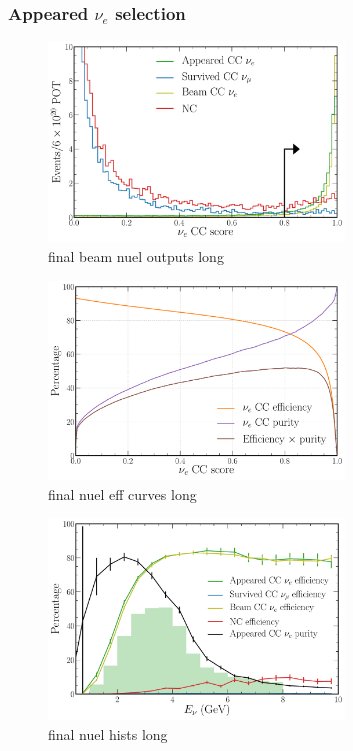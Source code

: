 \subsubsection*{Appeared $\nu_{e}$ selection} %

\begin{figure} %
    \includegraphics[width=0.7\textwidth]{diagrams/6-cvn/chipsnet/final_beam_nuel_outputs.pdf}
    \caption[final beam nuel outputs short]
    {final beam nuel outputs long}
    \label{fig:final_beam_nuel_outputs}
\end{figure}

\begin{figure} %
    \includegraphics[width=0.7\textwidth]{diagrams/6-cvn/chipsnet/final_nuel_eff_curves.pdf}
    \caption[final nuel eff curves short]
    {final nuel eff curves long}
    \label{fig:final_nuel_eff_curves}
\end{figure}

\begin{figure} %
    \includegraphics[width=0.7\textwidth]{diagrams/6-cvn/chipsnet/final_nuel_hists.pdf}
    \caption[final nuel hists short]
    {final nuel hists long}
    \label{fig:final_nuel_hists}
\end{figure}


